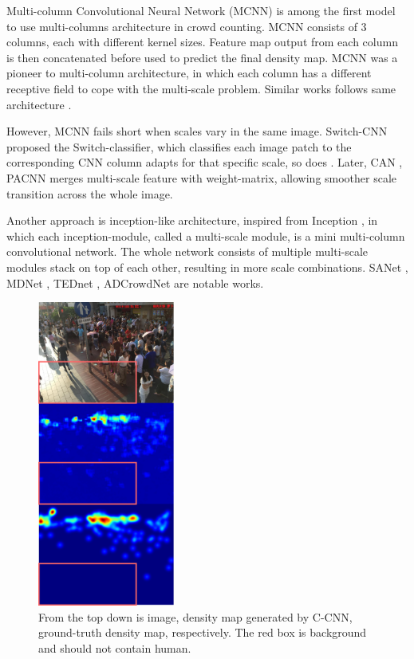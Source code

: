 Multi-column Convolutional Neural Network (MCNN) \cite{zhang2016single} is among the first model to use multi-columns architecture in crowd counting. MCNN consists of 3 columns, each with different kernel sizes. Feature map output from each column is then concatenated before used to predict the final density map. MCNN was a pioneer to multi-column architecture, in which each column has a different receptive field to cope with the multi-scale problem. Similar works follows same architecture \cite{zhang2019crowd, 9053780}. 

However, MCNN fails short when scales vary in the same image. Switch-CNN \cite{sam2017switching} proposed the Switch-classifier, which classifies each image patch to the corresponding CNN column adapts for that specific scale, so does \cite{8965799}. Later, CAN \cite{liu2019context}, PACNN \cite{shi2019revisiting} merges multi-scale feature with weight-matrix, allowing smoother scale transition across the whole image. 

Another approach is inception-like architecture, inspired from Inception \cite{szegedy2015going}, in which each inception-module, called a multi-scale module, is a mini multi-column convolutional network. The whole network consists of multiple multi-scale modules stack on top of each other, resulting in more scale combinations. SANet \cite{cao2018scale}, MDNet \cite{wang2019multi}, TEDnet \cite{jiang2019crowd}, ADCrowdNet \cite{liu2019adcrowdnet} are notable works. 


\begin{figure}[htbp]
\centerline{\includegraphics[width=0.4\textwidth]{Picture/problem/background_noise_shb.png}}
\caption{From the top down is image, density map generated by C-CNN, ground-truth density map, respectively. The red box is background and should not contain human.}
\label{fig:noise}
\end{figure}

